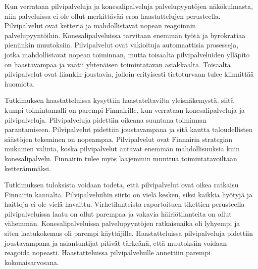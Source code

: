 Kun verrataan pilvipalveluja ja konesalipalveluja palvelupyyntöjen näkökulmasta, niin palveluissa ei ole ollut merkittävää eroa haastattelujen perusteella. Pilvipalvelut ovat ketteriä ja mahdollistavat nopean reagoinnin palvelupyyntöihin. Konesalipalveluissa tarvitaan enemmän työtä ja byrokratiaa pieniinkin muutoksiin. Pilvipalvelut ovat vakioituja automaattisia prosesseja, jotka mahdollistavat nopean toiminnan, mutta toisaalta pilvipalveluiden ylläpito on haastavampaa ja vaatii yhtenäisen toimintatavan asiakkaalta. Toisaalta pilvipalvelut ovat liiankin joustavia, jolloin erityisesti tietoturvaan tulee kiinnittää huomiota.

Tutkimuksen haastatteluissa kysyttiin haastateltavilta yleisnäkemystä, siitä kumpi toimintamalli on parempi Finnairille, kun verrataan konesalipalveluja ja pilvipalveluja.  Pilvipalveluja pidettiin oikeana suuntana toiminnan parantamiseen. Pilvipalvelut pidettiin joustavampana ja sitä kautta taloudellisten säästöjen tekeminen on nopeampaa. Pilvipalvelut ovat Finnairin strategian mukainen valinta, koska pilvipalvelut antavat enemmän mahdollisuuksia kuin konesalipalvelu. Finnairin tulee myös laajemmin muuttua toimintatavoiltaan ketterämmäksi.

Tutkimuksen tuloksista voidaan todeta, että pilvipalvelut ovat oikea ratkaisu Finnairin kannalta. Pilvipalveluihin siirto on vielä kesken, siksi kaikkia hyötyjä ja haittoja ei ole vielä havaittu. Virhetilanteista raportoituen tikettien perusteella pilvipalveluissa laatu on ollut parempaa ja vakavia häiriötilanteita on ollut vähemmän. Konesalipalveluissa palvelupyyntöjen ratkaisuaika oli lyhyempi ja siten laatukokemus oli parempi käyttäjille. Haastatteluissa pilvipalveluja pidettiin joustavampana ja asiantuntijat pitivät tärkeänä, että muutoksiin voidaan reagoida nopeasti. Haastatteluissa pilvipalveluille annettiin parempi kokonaisarvosana.